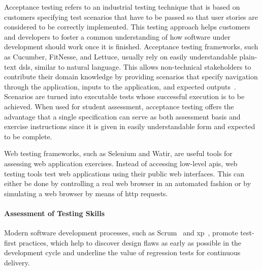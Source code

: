 Acceptance testing refers to an industrial testing technique that is based on customers specifying test scenarios that have to be passed so that user stories are considered to be correctly implemented. This testing approach helps customers and developers to foster a common understanding of how software under development should work once it is finished. Acceptance testing frameworks, such as Cucumber, FitNesse, and Lettuce, usually rely on easily understandable plain-text \glspl{dsl}, similar to natural language. This allows non-technical stakeholders to contribute their domain knowledge by providing scenarios that specify navigation through the application, inputs to the application, and expected outputs~\cite{fox2012crossing}. Scenarios are turned into executable tests whose successful execution is to be achieved. When used for student assessment, acceptance testing offers the advantage that a single specification can serve as both assessment basis and exercise instructions since it is given in easily understandable form and expected to be complete.

Web testing frameworks, such as Selenium and Watir, are useful tools for assessing web application exercises. Instead of accessing low-level \glspl{api}, web testing tools test web applications using their public web interfaces. This can either be done by controlling a real web browser in an automated fashion or by simulating a web browser by means of \gls{http} requests.

\paragraph{Assessment of Testing Skills}

Modern software development processes, such as Scrum~\cite{schwaber1997scrum} and \gls{xp}~\cite{beck2000extreme}, promote test-first practices, which help to discover design flaws as early as possible in the development cycle and underline the value of regression tests for continuous delivery.

